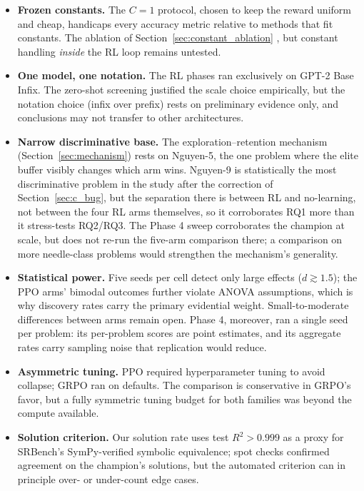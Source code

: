 \begin{itemize}
    \item \textbf{Frozen constants.} The $C=1$ protocol, chosen to keep the reward uniform and cheap, handicaps every accuracy metric relative to methods that fit constants. The ablation of Section~\ref{sec:constant_ablation} , but constant handling \emph{inside} the RL loop remains untested. %
    \item \textbf{One model, one notation.} The RL phases ran exclusively on GPT-2 Base Infix. The zero-shot screening justified the scale choice empirically, but the notation choice (infix over prefix) rests on preliminary evidence only, and conclusions may not transfer to other architectures.
    \item \textbf{Narrow discriminative base.} The exploration--retention mechanism (Section~\ref{sec:mechanism}) rests on Nguyen-5, the one problem where the elite buffer visibly changes which arm wins. Nguyen-9 is statistically the most discriminative problem in the study after the correction of Section~\ref{sec:c_bug}, but the separation there is between RL and no-learning, not between the four RL arms themselves, so it corroborates RQ1 more than it stress-tests RQ2/RQ3. The Phase 4 sweep corroborates the champion at scale, but does not re-run the five-arm comparison there; a comparison on more needle-class problems would strengthen the mechanism's generality.
    \item \textbf{Statistical power.} Five seeds per cell detect only large effects ($d \gtrsim 1.5$); the PPO arms' bimodal outcomes further violate ANOVA assumptions, which is why discovery rates carry the primary evidential weight. Small-to-moderate differences between arms remain open. Phase 4, moreover, ran a single seed per problem: its per-problem scores are point estimates, and its aggregate rates carry sampling noise that replication would reduce.
    \item \textbf{Asymmetric tuning.} PPO required hyperparameter tuning to avoid collapse; GRPO ran on defaults. The comparison is conservative in GRPO's favor, but a fully symmetric tuning budget for both families was beyond the compute available.
    \item \textbf{Solution criterion.} Our solution rate uses test $R^2 > 0.999$ as a proxy for SRBench's SymPy-verified symbolic equivalence; spot checks confirmed agreement on the champion's solutions, but the automated criterion can in principle over- or under-count edge cases.

\end{itemize}
